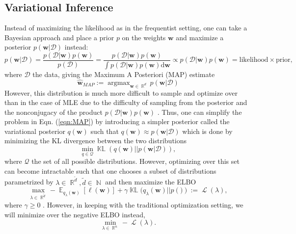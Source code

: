 \documentclass[a4paper, 11pt, oneside]{scrartcl}
\theoremstyle{break}
\DeclareMathOperator*{\argmax}{argmax}
\DeclareMathOperator{\Natural}{\mathbb{N}}
\DeclareMathOperator{\Real}{\mathbb{R}}
\DeclareMathOperator{\Expect}{\mathbb{E}}
\DeclareMathOperator{\ELBO}{\mathcal{L}}
\DeclareMathOperator{\KL}{\mathbb{KL}}
\newcommand{\matr}[1]{\boldsymbol{#1}}
\newcommand{\set}[1]{\mathcal{#1}}
\numberwithin{equation}{section}
\begin{document}
		\subsection{Variational Inference}
			Instead of maximizing the likelihood as in the frequentist setting, one can take a Bayesian approach and place a prior $p$ on the weights $\matr{w}$ and maximize a posterior $p(\matr{w} | \set{D})$ instead:
			\begin{equation}
				p(\matr{w} | \set{D}) = \frac{p(\set{D} | \matr{w}) p(\matr{w})}{p(\set{D})} = \frac{p(\set{D} | \matr{w}) p(\matr{w})}{\int p(\set{D} | \matr{w}) p(\matr{w}) \text{d}\matr{w}} \propto p(\set{D} | \matr{w}) p(\matr{w}) = \text{likelihood} \times \text{prior},
				\label{eqn:BayesRule}
			\end{equation}
			where $\set{D}$ the data, giving the Maximum A Posteriori (MAP) estimate
			\begin{equation}
				\matr{\hat{w}}_{MAP} := \argmax_{\matr{w} \in \Real^d} p(\matr{w} | \set{D})
				\label{eqn:MAP}
			\end{equation}
			However, this distribution is much more difficult to sample and optimize over than in the case of MLE due to the difficulty of sampling from the posterior and the nonconjugacy of the product $p(\set{D} | \matr{w}) p(\matr{w})$ \parencite{KNT+18}.
			Thus, one can simplify the problem in Eqn. (\ref{eqn:MAP}) by introducing a simpler posterior called the variational posterior $q(\matr{w})$ such that $q(\matr{w}) \approx p(\matr{w} | \set{D})$ which is done by minimizing the KL divergence between the two distributions 
			$$\min_{q \in \set{Q}} \KL(q(\matr{w}) || p(\matr{w} | \set{D})),$$
			where $\set{Q}$ the set of all possible distributions.
			However, optimizing over this set can become intractable such that one chooses a subset of distributions parametrized by $\lambda \in \Real^{\tilde{d}}, \tilde{d} \in \Natural$ and then maximize the ELBO 
			\begin{equation}
				\max_{\lambda \in \Real^{\tilde{d}}} -\Expect_{q_{\lambda}(\matr{w})}[\ell(\matr{w})] + \gamma \KL(q_{\lambda}(\matr{w}) || p(\matr)) := \ELBO(\lambda),
				\label{eqn:ELBO}
			\end{equation}
			where $\gamma \ge 0$ \parencite{ZSD+17, LSK20, LNK+21}.
			However, in keeping with the traditional optimization setting, we will minimize over the negative ELBO instead,
			\begin{equation*}
				\min_{\lambda \in \Real^n} -\ELBO(\lambda).
			\end{equation*}
\end{document}
